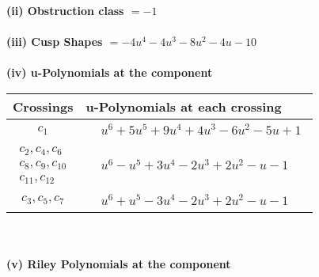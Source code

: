 \documentclass[1p]{elsarticle_modified}
\theoremstyle{definition}
\begin{document}
\flushleft \textbf{(ii) Obstruction class $= -1$}\\~\\
\flushleft \textbf{(iii) Cusp Shapes $= -4 u^4-4 u^3-8 u^2-4 u-10$}\\~\\
\newpage\renewcommand{\arraystretch}{1}
\flushleft \textbf{(iv) u-Polynomials at the component}\newline \\
\begin{tabular}{m{50pt}|m{274pt}}
Crossings & \hspace{64pt}u-Polynomials at each crossing \\
\hline $$\begin{aligned}c_{1}\end{aligned}$$&$\begin{aligned}
&u^6+5 u^5+9 u^4+4 u^3-6 u^2-5 u+1
\end{aligned}$\\
\hline $$\begin{aligned}c_{2},c_{4},c_{6}\\c_{8},c_{9},c_{10}\\c_{11},c_{12}\end{aligned}$$&$\begin{aligned}
&u^6- u^5+3 u^4-2 u^3+2 u^2- u-1
\end{aligned}$\\
\hline $$\begin{aligned}c_{3},c_{5},c_{7}\end{aligned}$$&$\begin{aligned}
&u^6+u^5-3 u^4-2 u^3+2 u^2- u-1
\end{aligned}$\\
\hline
\end{tabular}\\~\\
\newpage\renewcommand{\arraystretch}{1}
\flushleft \textbf{(v) Riley Polynomials at the component}\newline \\
\end{document}
